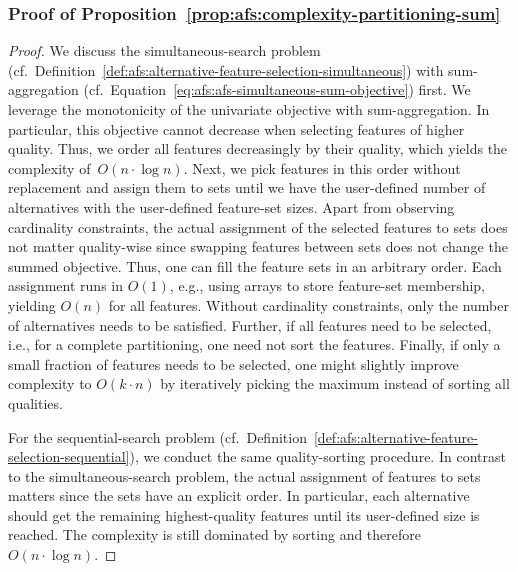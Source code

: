 \subsubsection{Proof of Proposition~\ref{prop:afs:complexity-partitioning-sum}}
\label{sec:appendix:afs:proofs:complexity-partitioning-sum}

\begin{proof}
	We discuss the simultaneous-search problem (cf.~Definition~\ref{def:afs:alternative-feature-selection-simultaneous}) with sum-aggregation (cf.~Equation~\ref{eq:afs:afs-simultaneous-sum-objective}) first.
	We leverage the monotonicity of the univariate objective with sum-aggregation.
	In particular, this objective cannot decrease when selecting features of higher quality.
	Thus, we order all features decreasingly by their quality, which yields the complexity of~$O(n \cdot \log n)$.
	Next, we pick features in this order without replacement and assign them to sets until we have the user-defined number of alternatives with the user-defined feature-set sizes.
	Apart from observing cardinality constraints, the actual assignment of the selected features to sets does not matter quality-wise since swapping features between sets does not change the summed objective.
	Thus, one can fill the feature sets in an arbitrary order.
	Each assignment runs in $O(1)$, e.g., using arrays to store feature-set membership, yielding $O(n)$ for all features.
	Without cardinality constraints, only the number of alternatives needs to be satisfied.
	Further, if all features need to be selected, i.e., for a complete partitioning, one need not sort the features.
	Finally, if only a small fraction of features needs to be selected, one might slightly improve complexity to $O(k \cdot n)$ by iteratively picking the maximum instead of sorting all qualities.

	For the sequential-search problem (cf.~Definition~\ref{def:afs:alternative-feature-selection-sequential}), we conduct the same quality-sorting procedure.
	In contrast to the simultaneous-search problem, the actual assignment of features to sets matters since the sets have an explicit order.
	In particular, each alternative should get the remaining highest-quality features until its user-defined size is reached.
	The complexity is still dominated by sorting and therefore~$O(n \cdot \log n)$.
\end{proof}

\section{}
\label{sec:appendix:csd}

